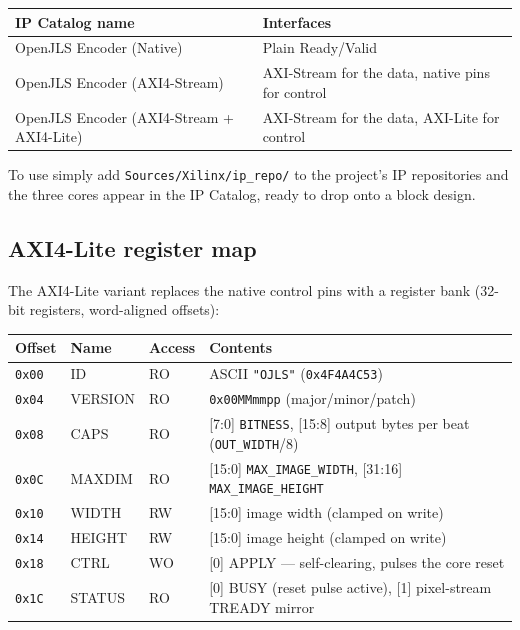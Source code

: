 \documentclass[10pt,a4paper]{article}
\begin{document}
\begin{table}[H]
  \centering
\begin{tabularx}{\textwidth}{@{}X X@{}}
  \toprule
  \textbf{IP Catalog name} & \textbf{Interfaces} \\
  \midrule
  OpenJLS Encoder (Native)                  & Plain Ready/Valid\\
  OpenJLS Encoder (AXI4-Stream)             & AXI-Stream for the data, native pins for control \\
  OpenJLS Encoder (AXI4-Stream + AXI4-Lite) & AXI-Stream for the data, AXI-Lite for control \\
  \bottomrule
\end{tabularx}
\end{table}

To use simply add \texttt{Sources/Xilinx/ip\_repo/} to the project's IP repositories
and the three cores appear in the
IP Catalog, ready to drop onto a block design.

\subsection{AXI4-Lite register map}
The AXI4-Lite variant replaces the native control pins with a register bank
(32-bit registers, word-aligned offsets):

\begin{table}[H]
  \centering
\begin{tabularx}{\textwidth}{@{}l l l X@{}}
  \toprule
  \textbf{Offset} & \textbf{Name} & \textbf{Access} & \textbf{Contents} \\
  \midrule
  \texttt{0x00} & ID      & RO & ASCII \texttt{"OJLS"} (\texttt{0x4F4A4C53}) \\
  \texttt{0x04} & VERSION & RO & \texttt{0x00MMmmpp} (major/minor/patch) \\
  \texttt{0x08} & CAPS    & RO & [7:0] \texttt{BITNESS}, [15:8] output bytes per beat (\texttt{OUT\_WIDTH}/8) \\
  \texttt{0x0C} & MAXDIM  & RO & [15:0] \texttt{MAX\_IMAGE\_WIDTH}, [31:16] \texttt{MAX\_IMAGE\_HEIGHT} \\
  \texttt{0x10} & WIDTH   & RW & [15:0] image width (clamped on write) \\
  \texttt{0x14} & HEIGHT  & RW & [15:0] image height (clamped on write) \\
  \texttt{0x18} & CTRL    & WO & [0] APPLY --- self-clearing, pulses the core reset \\
  \texttt{0x1C} & STATUS  & RO & [0] BUSY (reset pulse active), [1] pixel-stream TREADY mirror \\
  \bottomrule
\end{tabularx}
\end{table}
\end{document}
